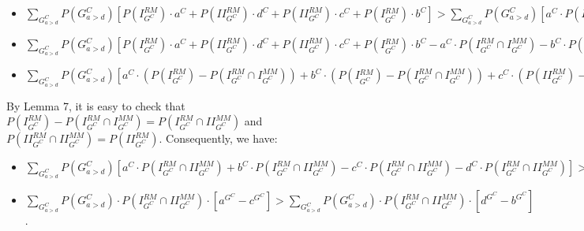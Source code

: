 \documentclass[fleqn,reqno,11pt]{article}
\begin{document}
\begin{itemize}
\item $\sum_{G_{a>d}^{C}}P(G_{a>d}^{C})[P(I_{G^{C}}^{RM})\cdot a^{C}+P(II_{G^{C}}^{RM})\cdot d^{C}+P(II_{G^{C}}^{RM})\cdot c^{C}+P(I{}_{G^{C}}^{RM})\cdot b^{C}]>\sum_{G_{a>d}^{C}}P(G_{a>d}^{C})[a^{C}\cdot P(I_{G^{C}}^{RM}\cap I_{G^{C}}^{MM})+b^{C}\cdot P(I_{G^{C}}^{RM}\cap I_{G^{C}}^{MM})+c^{C}\cdot(P(I_{G^{C}}^{RM}\cap II_{G^{C}}^{MM})+P(II_{G^{C}}^{RM}\cap II_{G^{C}}^{MM}))+d^{C}\cdot(P(II_{G^{C}}^{RM}\cap II_{G^{C}}^{MM})+P(I_{G^{C}}^{RM}\cap II_{G^{C}}^{MM}))]$
\item $\sum_{G_{a>d}^{C}}P(G_{a>d}^{C})[P(I_{G^{C}}^{RM})\cdot a^{C}+P(II_{G^{C}}^{RM})\cdot d^{C}+P(II_{G^{C}}^{RM})\cdot c^{C}+P(I{}_{G^{C}}^{RM})\cdot b^{C}-a^{C}\cdot P(I_{G^{C}}^{RM}\cap I_{G^{C}}^{MM})-b^{C}\cdot P(I_{G^{C}}^{RM}\cap I_{G^{C}}^{MM})-c^{C}\cdot(P(I_{G^{C}}^{RM}\cap II_{G^{C}}^{MM})+P(II_{G^{C}}^{RM}\cap II_{G^{C}}^{MM}))-d^{C}\cdot(P(II_{G^{C}}^{RM}\cap II_{G^{C}}^{MM})+P(I_{G^{C}}^{RM}\cap II_{G^{C}}^{MM}))]>0$
\item $\sum_{G_{a>d}^{C}}P(G_{a>d}^{C})[a^{C}\cdot(P(I_{G^{C}}^{RM})-P(I_{G^{C}}^{RM}\cap I_{G^{C}}^{MM}))+b^{C}\cdot(P(I{}_{G^{C}}^{RM})-P(I_{G^{C}}^{RM}\cap I_{G^{C}}^{MM}))+c^{C}\cdot(P(II_{G^{C}}^{RM})-P(I_{G^{C}}^{RM}\cap II_{G^{C}}^{MM})-P(II_{G^{C}}^{RM}\cap II_{G^{C}}^{MM}))+d^{C}\cdot(P(II_{G^{C}}^{RM})-P(II_{G^{C}}^{RM}\cap II_{G^{C}}^{MM})-P(I_{G^{C}}^{RM}\cap II_{G^{C}}^{MM}))]>0$
\end{itemize}
By Lemma 7, it is easy to check that $P(I_{G^{C}}^{RM})-P(I_{G^{C}}^{RM}\cap I_{G^{C}}^{MM})=P(I_{G^{C}}^{RM}\cap II_{G^{C}}^{MM})$
and $P(II_{G^{C}}^{RM}\cap II_{G^{C}}^{MM})=P(II_{G^{C}}^{RM})$.
Consequently, we have:
\begin{itemize}
\item $\sum_{G_{a>d}^{C}}P(G_{a>d}^{C})[a^{C}\cdot P(I_{G^{C}}^{RM}\cap II_{G^{C}}^{MM})+b^{C}\cdot P(I_{G^{C}}^{RM}\cap II_{G^{C}}^{MM})-c^{C}\cdot P(I_{G^{C}}^{RM}\cap II_{G^{C}}^{MM})-d^{C}\cdot P(I_{G^{C}}^{RM}\cap II_{G^{C}}^{MM})]>0$
\item $\sum_{G_{a>d}^{C}}P(G_{a>d}^{C})\cdot P(I_{G^{C}}^{RM}\cap II_{G^{C}}^{MM})\cdot[a^{G^{C}}-c^{G^{C}}]>\sum_{G_{a>d}^{C}}P(G_{a>d}^{C})\cdot P(I_{G^{C}}^{RM}\cap II_{G^{C}}^{MM})\cdot[d^{G^{C}}-b^{G^{C}}]$.
\end{itemize}
\medskip{}
\end{document}
